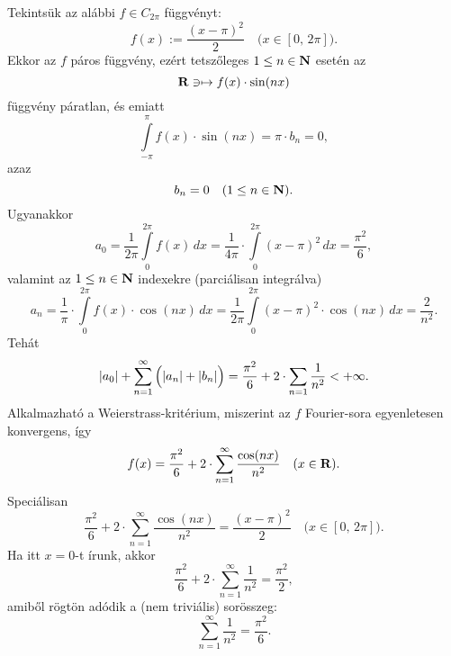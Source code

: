 Tekintsük az alábbi $f \in C_{2\pi}$ függvényt:
\[
	f(x) := \frac{(x-\pi)^2}{2} \quad \big(x \in [0, \, 2\pi]\big).
\]
Ekkor az $f$ páros függvény, ezért tetszőleges $1 \leq n \in \mathbf{N}$ esetén az
\[
	\mathbf{R} \ni \mapsto f(x) \cdot \sin(nx)
\]
függvény páratlan, és emiatt
\[
	\int\limits_{-\pi}^\pi f(x) \cdot \sin(nx) = \pi \cdot b_n = 0,
\]
azaz
\[
	b_n = 0 \quad (1 \leq n \in \mathbf{N}).
\]
Ugyanakkor
\[
	a_0 = \frac{1}{2\pi} \int\limits_0^{2\pi} f(x) \, dx = \frac{1}{4\pi} \cdot \int\limits_0^{2\pi} (x - \pi)^2 \, dx = \frac{\pi^2}{6},
\]
valamint az $1 \leq n \in \mathbf{N}$ indexekre (parciálisan integrálva)
\[
	a_n = \frac{1}{\pi} \cdot \int\limits_0^{2\pi} f(x) \cdot \cos(nx) \, dx = \frac{1}{2\pi} \int\limits_0^{2\pi} (x-\pi)^2 \cdot \cos(nx) \, dx = \frac{2}{n^2}.
\]
Tehát
\[
	|a_0| + \sum_{n=1}^\infty \Big(  |a_n| + |b_n|  \Big) = \frac{\pi^2}{6} + 2 \cdot \sum_{n=1} \frac{1}{n^2} < + \infty.
\]
Alkalmazható a Weierstrass-kritérium, miszerint az $f$ Fourier-sora egyenletesen konvergens, így
\[
	f(x) = \frac{\pi^2}{6} + 2 \cdot \sum_{n=1}^\infty \frac{\cos(nx)}{n^2} \quad (x \in \mathbf{R}).
\]
Speciálisan
\[
	\frac{\pi^2}{6} + 2 \cdot \sum_{n=1}^\infty \frac{\cos(nx)}{n^2} = \frac{(x-\pi)^2}{2} \quad \big(x \in [0, \, 2\pi]\big).
\]
Ha itt $x = 0$-t írunk, akkor
\[
	\frac{\pi^2}{6} + 2 \cdot \sum_{n=1}^\infty \frac{1}{n^2} = \frac{\pi^2}{2},
\]
amiből rögtön adódik a (nem triviális) sorösszeg:
\[
	\sum_{n=1}^\infty \frac{1}{n^2} = \frac{\pi^2}{6}.
\]